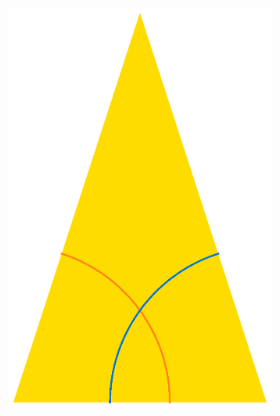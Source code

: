 \documentclass[]{article}
\begin{document}
\begin{figure}[H]
        \begin{subfigure}[b]{\textwidth}
        \begin{subfigure}[b]{0.4\textwidth}
        \centering
		\includegraphics[scale=0.3]{RobinsonSkinny}
        \end{subfigure}\hfill \raisebox{30px}{\huge$\rightarrow$} \hfill
        \begin{subfigure}[b]{0.4\textwidth}
        \centering

\end{subfigure}
\end{subfigure}
\end{figure}
\end{document}
